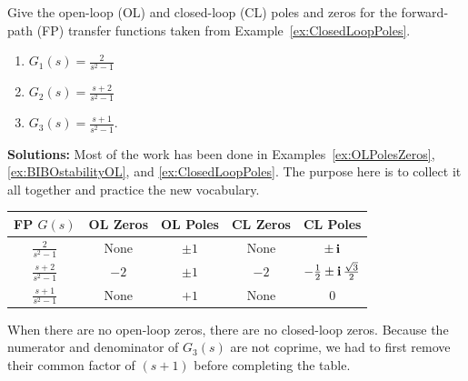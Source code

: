 \vspace*{.2cm}
\begin{example} Give the open-loop (OL) and closed-loop (CL) poles and zeros for the forward-path (FP) transfer functions taken from Example~\ref{ex:ClosedLoopPoles}.
 \begin{enumerate}
\renewcommand{\labelenumi}{(\alph{enumi})}
\setlength{\itemsep}{.2cm}
\item $G_1(s) = \frac{2}{s^2-1}$

\item $G_2(s) = \frac{s+2}{s^2-1}$ 

\item $G_3(s) = \frac{s+1}{s^2-1}$.
\end{enumerate}    
\end{example}
\textbf{Solutions:}
Most of the work has been done in Examples~\ref{ex:OLPolesZeros}, \ref{ex:BIBOstabilityOL}, and \ref{ex:ClosedLoopPoles}. The purpose here is to collect it all together and practice the new vocabulary.\\

\begin{center}
\renewcommand{\arraystretch}{1.5}
\begin{tabular}{|c|c|c|c|c|}
\hline
FP $G(s)$ & OL Zeros & OL Poles & CL Zeros & CL Poles \\ \hline
$\frac{2}{s^2-1} $    &   None       &   $\pm 1$       &    None      &    $\pm \mathop{\bm{\mathrm i}}$      \\ \hline
$\frac{s+2}{s^2-1}$   &     $-2$     &   $\pm 1$        &     $-2$     &     $-\frac{1}{2} \pm \mathop{\bm{\mathrm i}} \frac{\sqrt{3}}{2}$     \\ \hline
$\frac{s+1}{s^2-1}$      &   None       &   $+1$       &     None     &     $0$     \\ \hline
\end{tabular}
\end{center}
When there are no open-loop zeros, there are no closed-loop zeros. Because the numerator and denominator of $G_3(s)$ are not coprime, we had to first remove their common factor of $(s+1)$ before completing the table. 

\Qed

